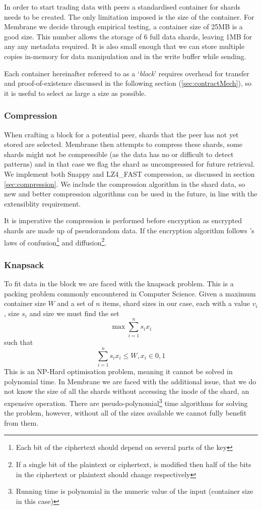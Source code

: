 \documentclass[11pt, a4paper, twoside]{report}
\begin{document}
In order to start trading data with peers a standardised container for shards needs to be created. The only limitation imposed is the size of the container. For Membrane we decide through empirical testing, a container size of 25MB is a good size. This number allows the storage of 6 full data shards, leaving 1MB for any any metadata required. It is also small enough that we can store multiple copies in-memory for data manipulation and in the write buffer while sending.

Each container hereinafter refereed to as a `\emph{block}' requires overhead for transfer and proof-of-existence discussed in the following section (\ref{sec:contractMech}), so it is useful to select as large a size as possible.

\subsubsection{Compression}

When crafting a block for a potential peer, shards that the peer has not yet stored are selected. Membrane then attempts to compress these shards, some shards might not be compressible (as the data has no or difficult to detect patterns) and in that case we flag the shard as uncompressed for future retrieval. We implement both Snappy and LZ4\_FAST compression, as discussed in section \ref{sec:compression}. We include the compression algorithm in the shard data, so new and better compression algorithms can be used in the future, in line with the extensiblity requirement.

It is imperative the compression is performed before encryption as encrypted shards are made up of pseudorandom data. If the encryption algorithm follows \cite{shannon1945mathematical}'s laws of confusion\footnote{Each bit of the ciphertext should depend on several parts of the key} and diffusion\footnote{If a single bit of the plaintext or ciphertext, is modified then half of the bits in the ciphertext or plaintext should change respectively}.

\subsubsection{Knapsack}

To fit data in the block we are faced with the knapsack problem. This is a packing problem commonly encountered in Computer Science. \citep{skiena1999interested} Given a maximum container size $W$ and a set of $n$ items, shard sizes in our case, each with a value $v_i$, size $s_i$ and size we must find the set 
$$\max \sum_{i=1}^{n} s_{i}x_{i}$$ 
such that 
$$\sum_{i=1}^{n} s_{i}x_{i} \leq W, x_i \in {0, 1}$$
This is an NP-Hard optimisation problem, \citep{skiena1999interested} meaning it cannot be solved in polynomial time. In Membrane we are faced with the additional issue, that we do not know the size of all the shards without accessing the inode of the shard, an expensive operation. There are pseudo-polynomial\footnote{Running time is polynomial in the numeric value of the input (container size in this case)} time algorithms for solving the problem, however, without all of the sizes available we cannot fully benefit from them.
\end{document}

